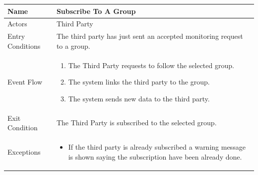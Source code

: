 \begin{enumerate}
\FloatBarrier
\begin{table}[h]
\begin{tabular}{|l|p{}|}
\hline
Name             & Subscribe To A Group\\ \hline
Actors           & Third Party  \\ \hline
Entry Conditions & The third party has just sent an accepted monitoring request to a group. \\ \hline
Event Flow       & \begin{enumerate}
            \item The Third Party requests to follow the selected group.
			\item The system links the third party to the group.
            \item The system sends new data to the third party.
        \end{enumerate}\\ \hline
Exit Condition   & The Third Party is subscribed to the selected group.\\ \hline
Exceptions       & \begin{itemize}
            \item If the third party is already subscribed a warning message is shown saying the subscription have been already done.
        \end{itemize}\\ \hline
\end{tabular}
\end{table}
\FloatBarrier


\end{enumerate}
